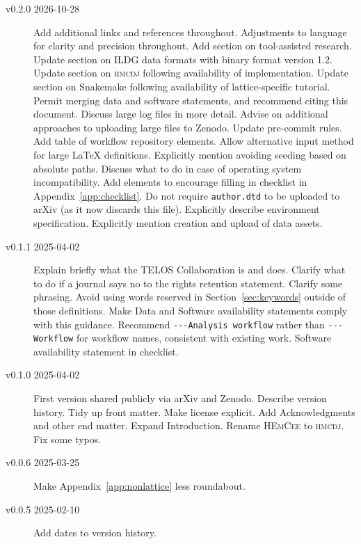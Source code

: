 \documentclass{article}
\newcommand\filename[1]{\texttt{#1}\xspace}
\newcommand\program[1]{\textsc{#1}\xspace}
\begin{document}
\begin{description}
  \item[v0.2.0 2026-10-28]
        Add additional links and references throughout.
        Adjustments to language for clarity and precision throughout.
        Add section on tool-assisted research.
        Update section on ILDG data formats with binary format version 1.2.
        Update section on \program{hmcdj} following availability of implementation.
        Update section on Snakemake following availability of lattice-specific tutorial.
        Permit merging data and software statements, and recommend citing this document.
        Discuss large log files in more detail.
        Advise on additional approaches to uploading large files to Zenodo.
        Update pre-commit rules.
        Add table of workflow repository elements.
        Allow alternative input method for large LaTeX definitions.
        Explicitly mention avoiding seeding based on absolute paths.
        Discuss what to do in case of operating system incompatibility.
        Add elements to encourage filling in checklist in Appendix~\ref{app:checklist}.
        Do not require \filename{author.dtd} to be uploaded to arXiv
        (as it now discards this file).
        Explicitly describe environment specification.
        Explicitly mention creation and upload of data assets.
  \item[v0.1.1 2025-04-02]
        Explain briefly what the TELOS Collaboration is and does.
        Clarify what to do if a journal says no to the rights retention statement.
        Clarify some phrasing.
        Avoid using words reserved in Section~\ref{sec:keywords}
        outside of those definitions.
        Make Data and Software availability statements comply with this guidance.
        Recommend \verb|---Analysis workflow| rather than \verb|---Workflow|
        for workflow names,
        consistent with existing work.
        Software availability statement in checklist.
  \item[v0.1.0 2025-04-02]
        First version shared publicly via arXiv and Zenodo.
        Describe version history.
        Tidy up front matter.
        Make license explicit.
        Add Acknowledgments and other end matter.
        Expand Introduction.
        Rename \program{HEmCee} to \program{hmcdj}.
        Fix some typos.
  \item[v0.0.6 2025-03-25]
        Make Appendix~\ref{app:nonlattice} less roundabout.
  \item[v0.0.5 2025-02-10]
        Add dates to version history.

\end{description}
\end{document}
